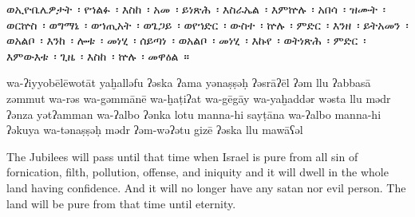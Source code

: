 
\begin{ethiopictext}
    ወኢዮቤሌዎታት~፡ የኀልፉ~፡ እስከ~፡ አመ~፡ ይነጽሕ~፡ እስራኤል~፡
    እምኵሉ~፡ አበሳ~፡ ዝሙት~፡ ወርኵስ~፡ ወግማኔ~፡ ወኀጢአት~፡ ወጌጋይ~፡ 
    ወየኀድር~፡ ውስተ~፡ ኵሉ~፡ ምድር~፡ እንዘ~፡ ይትአመን~፡ ወአልቦ~፡
    እንከ~፡ ሎቱ~፡ መነሂ~፡ ሰይጣነ~፡ ወአልቦ~፡ መነሂ~፡ እኩየ~፡ ወትነጽሕ~፡ 
    ምድር~፡ እምውእቱ~፡ ጊዜ~፡ እስከ~፡ ኵሉ~፡ መዋዕል~።
\end{ethiopictext}

\begin{transliteration}
    wa-ʔiyyobēlēwotāt yaḫalləfu ʔəska ʔama yənaṣṣəḥ ʔəsrāʔēl
    ʔəm llu ʔabbasā zəmmut wa-rə\kw{}s wa-gəmmānē wa-ḫaṭiʔat wa-gēgāy
    wa-yaḫaddər wəsta llu mədr ʔənza yətʔamman wa-ʔalbo
    ʔənka lotu manna-hi sayṭāna wa-ʔalbo manna-hi ʔəkuya wa-tənaṣṣəḥ
    mədr ʔəm-wəʔətu gizē ʔəska llu mawāʕəl
\end{transliteration}

\begin{translation}
    The Jubilees will pass until that time when Israel is pure
    from all sin of fornication, filth, pollution, offense, and iniquity
    and it will dwell in the whole land having confidence. And it will no longer have
    any satan nor evil person. The land will be pure from that time until eternity.
\end{translation}